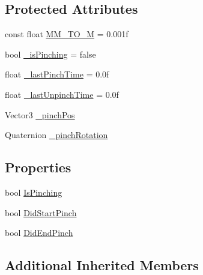 \subsection*{Protected Attributes}
\begin{DoxyCompactItemize}
\item 
const float \mbox{\hyperlink{class_leap_1_1_unity_1_1_pinch_detector_a2df7a99e546ce93af87c8260c178081d}{M\+M\+\_\+\+T\+O\+\_\+M}} = 0.\+001f
\item 
bool \mbox{\hyperlink{class_leap_1_1_unity_1_1_pinch_detector_aca898b59c0f8efe5adf4dd45d01c9550}{\+\_\+is\+Pinching}} = false
\item 
float \mbox{\hyperlink{class_leap_1_1_unity_1_1_pinch_detector_aabb39619a5e4b5206ad9ef6ac6586b5f}{\+\_\+last\+Pinch\+Time}} = 0.\+0f
\item 
float \mbox{\hyperlink{class_leap_1_1_unity_1_1_pinch_detector_aa3084c08805ef8a4e189ed5fa0e4d6fa}{\+\_\+last\+Unpinch\+Time}} = 0.\+0f
\item 
Vector3 \mbox{\hyperlink{class_leap_1_1_unity_1_1_pinch_detector_a819edd44c25cd99aa48276df6bca0609}{\+\_\+pinch\+Pos}}
\item 
Quaternion \mbox{\hyperlink{class_leap_1_1_unity_1_1_pinch_detector_a74bf54422503b751787d166ca278dab8}{\+\_\+pinch\+Rotation}}
\end{DoxyCompactItemize}
\subsection*{Properties}
\begin{DoxyCompactItemize}
\item 
bool \mbox{\hyperlink{class_leap_1_1_unity_1_1_pinch_detector_a2e11562e55156374f77dea79fc53f07b}{Is\+Pinching}}
\item 
bool \mbox{\hyperlink{class_leap_1_1_unity_1_1_pinch_detector_a39e19b50293ea310376018003c49d18e}{Did\+Start\+Pinch}}
\item 
bool \mbox{\hyperlink{class_leap_1_1_unity_1_1_pinch_detector_a72688f6f521cf7614318f10ba2e52cd0}{Did\+End\+Pinch}}
\end{DoxyCompactItemize}
\subsection*{Additional Inherited Members}



